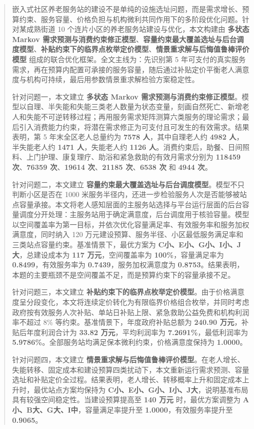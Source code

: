 \begin{abstract}
嵌入式社区养老服务站的建设不是单纯的设施选址问题，而是需求增长、预算约束、服务容量、价格负担与机构微利共同作用下的多阶段优化问题。针对某成熟街道 10 个连片小区的养老服务站建设与优化，本文构建由 \textbf{多状态 Markov 需求预测与消费约束修正模型}、\textbf{容量约束最大覆盖选址与后台调度模型}、\textbf{补贴约束下的临界点枚举定价模型}、\textbf{情景重求解与后悔值鲁棒评价模型} 组成的联合优化框架。全文主线为：先识别第 5 年可支付的真实服务需求，再在预算内配置可承接的服务容量，随后通过补贴定价平衡老人满意度与机构可持续，最后用参数情景重求解检验方案稳定性。

针对问题一，本文建立 \textbf{多状态 Markov 需求预测与消费约束修正模型}。模型以自理、半失能和失能三类老人数量为状态变量，刻画自然死亡、新增老人和失能不可逆转移过程；再用服务需求矩阵测算六类服务的理论需求；最后引入消费能力约束，将潜在需求修正为可支付且可发生的有效需求。结果表明，第 5 年末全区老人总量约为 \textbf{7578 人}，其中自理老人约 \textbf{4982 人}，半失能老人约 \textbf{1471 人}，失能老人约 \textbf{1126 人}。消费约束后，助餐、日间照料、上门护理、康复理疗、助浴和紧急救助的有效月需求分别为 \textbf{118459 次}、\textbf{76359 次}、\textbf{19614 次}、\textbf{21185 次}、\textbf{6538 次} 和 \textbf{4944 次}。

针对问题二，本文建立 \textbf{容量约束最大覆盖选址与后台调度模型}。模型不只判断小区是否在 1000 米服务半径内，还进一步检验服务人次是否能够被站点容量承接。本文将老人感知层面的主服务站选择与平台运行层面的后台容量调度分开处理：主服务站用于确定满意度，后台调度用于核验容量。模型以空间覆盖率为第一目标，并依次优化容量满足率、有效服务率和服务加权满意度，同时纳入 120 万元建设预算、服务半径、小区最低服务满足率和三类站点容量约束。基准情景下，最优方案为 \textbf{C小、E小、G小、I小、J大}，总建设成本为 \textbf{117 万元}，空间覆盖率为 \textbf{100\%}，容量满足率为 \textbf{0.8499}，有效服务率为 \textbf{0.7439}，服务加权满意度为 \textbf{0.8753}。结果表明，本题的主要瓶颈不是空间覆盖不足，而是预算约束下的容量承接不足。

针对问题三，本文建立 \textbf{补贴约束下的临界点枚举定价模型}。由于价格满意度呈分段变化，本文将连续定价转化为有限临界价格组合枚举，并同时考虑政府按有效服务人次补贴、单站日补贴上限、紧急救助公益免费和机构利润率不超过 8\% 等约束。基准情景下，年度政府补贴总额为 \textbf{240.90 万元}，补贴后年度利润合计为 \textbf{33.82 万元}，平均利润率为 \textbf{7.2691\%}，最低利润率为 \textbf{5.9786\%}。全部服务站均满足保本微利约束，价格满意度保持为 \textbf{1.0000}。

针对问题四，本文建立 \textbf{情景重求解与后悔值鲁棒评价模型}。在老人增长、失能转移、固定成本和建设预算四类扰动下，本文重新运行需求预测、容量选址和补贴定价全过程。结果表明，老人增长、转移概率上升和固定成本上升时，最优站点方案均保持为 \textbf{C小、E小、G小、I小、J大}，说明基准布局具有较强空间稳定性。当建设预算提高至 \textbf{140 万元} 时，最优方案调整为 \textbf{A小、B大、G大、I中}，容量满足率提升至 \textbf{1.0000}，有效服务率提升至 \textbf{0.9065}。


\end{abstract}
